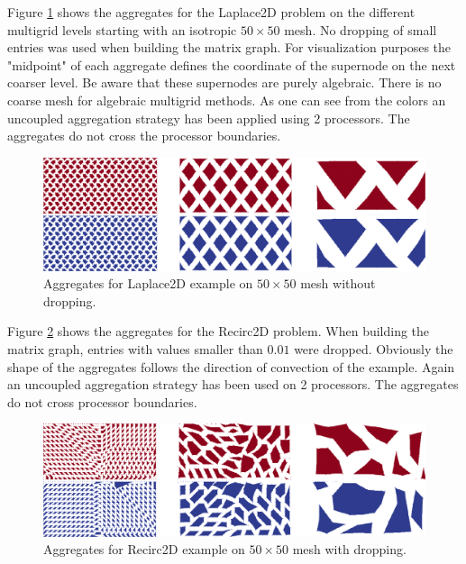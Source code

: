 \documentclass[12pt,a4paper]{article}
\begin{document}
Figure \ref{fig:symAggs} shows the aggregates for the Laplace2D problem on the different multigrid levels starting with an isotropic $50\times 50$ mesh. No dropping of small entries was used when building the matrix graph. For visualization purposes the "midpoint" of each aggregate defines the coordinate of the supernode on the next coarser level. Be aware that these supernodes are purely algebraic. There is no coarse mesh for algebraic multigrid methods. As one can see from the colors an uncoupled aggregation strategy has been applied using 2 processors. The aggregates do not cross the processor boundaries.

\begin{figure}
\includegraphics[width=\textwidth]{images/aggsSymm.png}
\caption{Aggregates for Laplace2D example on $50\times 50$ mesh without dropping.}
\label{fig:symAggs}
\end{figure}

Figure \ref{fig:nonsymAggs} shows the aggregates for the Recirc2D problem. When building the matrix graph, entries with values smaller than $0.01$ were dropped. Obviously the shape of the aggregates follows the direction of convection of the example. Again an uncoupled aggregation strategy has been used on 2 processors. The aggregates do not cross processor boundaries.
\begin{figure}
\includegraphics[width=\textwidth]{images/aggsNonSymm.png}
\caption{Aggregates for Recirc2D example on $50\times 50$ mesh with dropping.}
\label{fig:nonsymAggs}
\end{figure}
\end{document}
